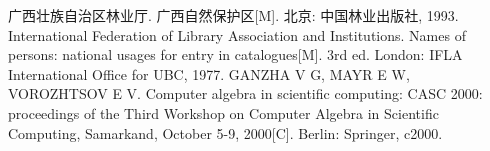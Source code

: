 

\begin{thebibliography}{99}
	\setlength{\itemsep}{-5pt}
	 广西壮族自治区林业厅. 广西自然保护区[M]. 北京: 中国林业出版社, 1993.
	International Federation of Library Association and Institutions. Names of persons: national usages for entry in catalogues[M]. 3rd ed. London: IFLA International Office for UBC, 1977.
	 GANZHA V G, MAYR E W, VOROZHTSOV E V. Computer algebra in scientific computing: CASC 2000: proceedings of the Third Workshop on Computer Algebra in Scientific Computing, Samarkand, October 5-9, 2000[C]. Berlin: Springer, c2000.
\end{thebibliography}